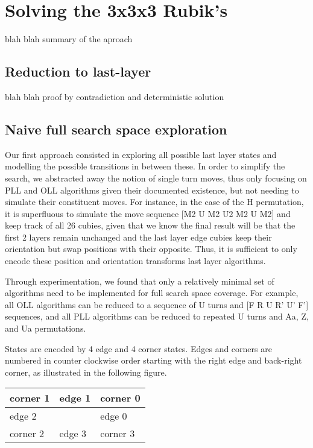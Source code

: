 \documentclass{article}
\begin{document}
    \section{Solving the 3x3x3 Rubik's}
        blah blah summary of the aproach
    
        \subsection{Reduction to last-layer}
            blah blah proof by contradiction and deterministic solution
        
        \subsection{Naive full search space exploration}

            Our first approach consisted in exploring all possible last layer
            states and modelling the possible transitions in between these. In
            order to simplify the search, we abstracted away the notion of
            single turn moves, thus only focusing on PLL and OLL algorithms
            given their documented existence, but not needing to simulate their
            constituent moves.
            For instance, in the case of the H permutation, it is superfluous to
            simulate the move sequence [M2 U M2 U2 M2 U M2] and keep track of
            all 26 cubies, given that we know the final result will be that the
            first 2 layers remain unchanged and the last layer edge cubies keep
            their orientation but swap positions with their opposite.
            Thus, it is sufficient to only encode these position and orientation
            transforms last layer algorithms.

            Through experimentation, we found that only a relatively minimal set
            of algorithms need to be implemented for full search space coverage.
            For example, all OLL algorithms can be reduced to a sequence of U
            turns and [F R U R' U' F'] sequences, and all PLL algorithms can
            be reduced to repeated U turns and Aa, Z, and Ua permutations.

            States are encoded by 4 edge and 4 corner states. Edges and corners
            are numbered in counter clockwise order starting with the right
            edge and back-right corner, as illustrated in the following figure.

            \begin{table}[h]
            \centering
            \begin{tabular}{|l|l|l|}
            \hline
            corner 1 & edge 1 & corner 0\\
            \hline
            edge 2 & & edge 0\\
            \hline
            corner 2 & edge 3 & corner 3\\
            \hline
            \end{tabular}
            \end{table}
\end{document}
